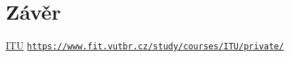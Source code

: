 \documentclass[12pt,a4paper,titlepage,final]{article}
\begin{document}
\section{Závěr} \label{zaver}

\begin{thebibliography}{1}

\href{https://www.fit.vutbr.cz/study/courses/ITU/private/}{ITU} \newline
\href{https://www.fit.vutbr.cz/study/courses/ITU/private/}{\nolinkurl{https://www.fit.vutbr.cz/study/courses/ITU/private/}}

\end{thebibliography}

\end{document}
